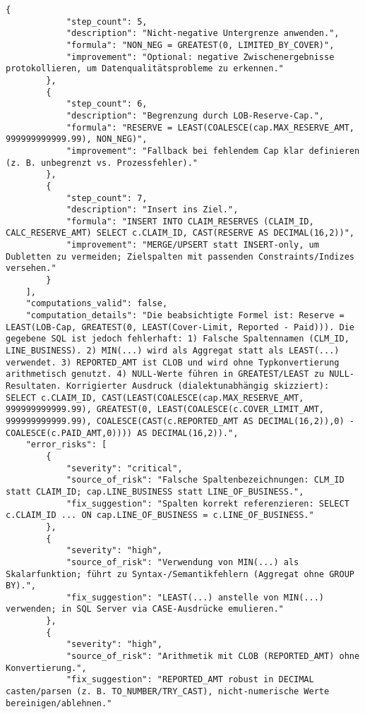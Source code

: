 \begin{lstlisting}[caption={Ausgabe: GPT-5 Anwendungsfall 10 Robustheitsdurchlauf},label={gpt_case10_prompt3}]
        {
            "step_count": 5,
            "description": "Nicht-negative Untergrenze anwenden.",
            "formula": "NON_NEG = GREATEST(0, LIMITED_BY_COVER)",
            "improvement": "Optional: negative Zwischenergebnisse protokollieren, um Datenqualitätsprobleme zu erkennen."
        },
        {
            "step_count": 6,
            "description": "Begrenzung durch LOB-Reserve-Cap.",
            "formula": "RESERVE = LEAST(COALESCE(cap.MAX_RESERVE_AMT, 999999999999.99), NON_NEG)",
            "improvement": "Fallback bei fehlendem Cap klar definieren (z. B. unbegrenzt vs. Prozessfehler)."
        },
        {
            "step_count": 7,
            "description": "Insert ins Ziel.",
            "formula": "INSERT INTO CLAIM_RESERVES (CLAIM_ID, CALC_RESERVE_AMT) SELECT c.CLAIM_ID, CAST(RESERVE AS DECIMAL(16,2))",
            "improvement": "MERGE/UPSERT statt INSERT-only, um Dubletten zu vermeiden; Zielspalten mit passenden Constraints/Indizes versehen."
        }
    ],
    "computations_valid": false,
    "computation_details": "Die beabsichtigte Formel ist: Reserve = LEAST(LOB-Cap, GREATEST(0, LEAST(Cover-Limit, Reported - Paid))). Die gegebene SQL ist jedoch fehlerhaft: 1) Falsche Spaltennamen (CLM_ID, LINE_BUSINESS). 2) MIN(...) wird als Aggregat statt als LEAST(...) verwendet. 3) REPORTED_AMT ist CLOB und wird ohne Typkonvertierung arithmetisch genutzt. 4) NULL-Werte führen in GREATEST/LEAST zu NULL-Resultaten. Korrigierter Ausdruck (dialektunabhängig skizziert): SELECT c.CLAIM_ID, CAST(LEAST(COALESCE(cap.MAX_RESERVE_AMT, 999999999999.99), GREATEST(0, LEAST(COALESCE(c.COVER_LIMIT_AMT, 999999999999.99), COALESCE(CAST(c.REPORTED_AMT AS DECIMAL(16,2)),0) - COALESCE(c.PAID_AMT,0)))) AS DECIMAL(16,2)).",
    "error_risks": [
        {
            "severity": "critical",
            "source_of_risk": "Falsche Spaltenbezeichnungen: CLM_ID statt CLAIM_ID; cap.LINE_BUSINESS statt LINE_OF_BUSINESS.",
            "fix_suggestion": "Spalten korrekt referenzieren: SELECT c.CLAIM_ID ... ON cap.LINE_OF_BUSINESS = c.LINE_OF_BUSINESS."
        },
        {
            "severity": "high",
            "source_of_risk": "Verwendung von MIN(...) als Skalarfunktion; führt zu Syntax-/Semantikfehlern (Aggregat ohne GROUP BY).",
            "fix_suggestion": "LEAST(...) anstelle von MIN(...) verwenden; in SQL Server via CASE-Ausdrücke emulieren."
        },
        {
            "severity": "high",
            "source_of_risk": "Arithmetik mit CLOB (REPORTED_AMT) ohne Konvertierung.",
            "fix_suggestion": "REPORTED_AMT robust in DECIMAL casten/parsen (z. B. TO_NUMBER/TRY_CAST), nicht-numerische Werte bereinigen/ablehnen."

\end{lstlisting}
